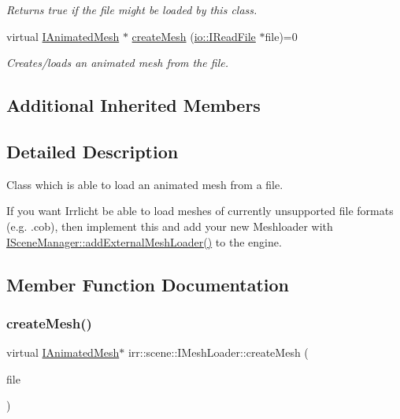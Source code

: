 \begin{DoxyCompactItemize}
\begin{DoxyCompactList}\small\item\em Returns true if the file might be loaded by this class. \end{DoxyCompactList}\item 
virtual \hyperlink{classirr_1_1scene_1_1IAnimatedMesh}{I\+Animated\+Mesh} $\ast$ \hyperlink{classirr_1_1scene_1_1IMeshLoader_ad09c19dd8c8608f0e49c40102e2aaee1}{create\+Mesh} (\hyperlink{classirr_1_1io_1_1IReadFile}{io\+::\+I\+Read\+File} $\ast$file)=0
\begin{DoxyCompactList}\small\item\em Creates/loads an animated mesh from the file. \end{DoxyCompactList}\end{DoxyCompactItemize}
\subsection*{Additional Inherited Members}


\subsection{Detailed Description}
Class which is able to load an animated mesh from a file. 

If you want Irrlicht be able to load meshes of currently unsupported file formats (e.\+g. .cob), then implement this and add your new Meshloader with \hyperlink{classirr_1_1scene_1_1ISceneManager_a808972cc001db86c0576c38b3b3fbbf7}{I\+Scene\+Manager\+::add\+External\+Mesh\+Loader()} to the engine. 

\subsection{Member Function Documentation}
\mbox{\label{classirr_1_1scene_1_1IMeshLoader_ad09c19dd8c8608f0e49c40102e2aaee1}} 
\subsubsection{\texorpdfstring{create\+Mesh()}{createMesh()}\hspace{0.1cm}{\footnotesize\ttfamily [1/2]}}
{\footnotesize\ttfamily virtual \hyperlink{classirr_1_1scene_1_1IAnimatedMesh}{I\+Animated\+Mesh}$\ast$ irr\+::scene\+::\+I\+Mesh\+Loader\+::create\+Mesh (\begin{DoxyParamCaption}\item[{\hyperlink{classirr_1_1io_1_1IReadFile}{io\+::\+I\+Read\+File} $\ast$}]{file }\end{DoxyParamCaption})\hspace{0.3cm}{\ttfamily [pure virtual]}}



